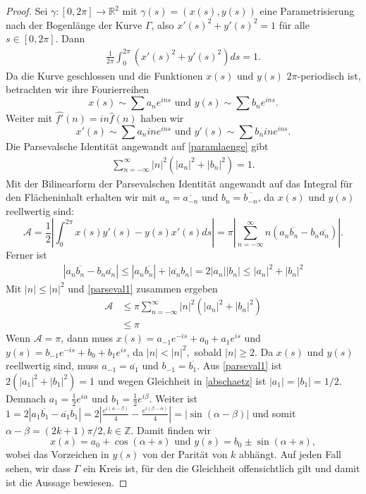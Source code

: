 \documentclass[12pt,a4paper]{article}
\theoremstyle{plain}
\newcommand{\R}{\mathbb{R}}
\newcommand{\Z}{\mathbb{Z}}
\numberwithin{equation}{section}
\begin{document}
\begin{proof}
Sei $\gamma:[0,2\pi]\rightarrow \R^2$ mit $\gamma(s)=(x(s),y(s))$ eine Parametrisierung nach der Bogenlänge der Kurve $\Gamma$, also $x'(s)^2+y'(s)^2=1$ für alle $s\in [0,2\pi]$. Dann \begin{align}\label{paramlaenge}
\frac{1}{2\pi} \int_0^{2\pi} {\left(x'(s)^2+y'(s)^2\right) ds} = 1.
\end{align} 
Da die Kurve geschlossen und die Funktionen $x(s)$ und $y(s)$ $2\pi$-periodisch ist, betrachten wir ihre Fourierreihen \[x(s)\sim \sum a_ne^{ins} \text{ und } y(s)\sim \sum b_ne^{ins}. \]  Weiter mit $\hat{f'}(n)=i n\hat{f}(n)$ haben wir \[x'(s)\sim \sum  a_n i n e^{ins} \text{ und } y'(s)\sim \sum b_n i n e^{ins}. \] Die Parsevalsche Identität angewandt auf \eqref{paramlaenge} gibt \begin{align} \label{parseval1}
\sum_{n=-\infty}^\infty |n|^2(|a_n|^2+|b_n|^2)=1.
\end{align}
Mit der Bilinearform der Parsevalschen Identität angewandt auf das Integral für den Flächen\-in\-halt erhalten wir mit $a_n=\overline{a_{-n}}$ und $b_n=\overline{b_{-n}}$, da $x(s)$ und $y(s)$ reellwertig sind:
\[\mathcal{A}=\frac{1}{2} \left|\int_0^{2\pi} {x(s)y'(s)-y(s)x'(s)ds}\right|=\pi\left|\sum_{n=-\infty}^\infty {n\left(a_n\overline{b_n}-b_n\overline{a_n}\right) } \right|. \] 
Ferner ist \begin{align} \label{abschaetz}
|a_n\overline{b_n} -b_n\overline{a_n}|\leq |a_n\overline{b_n}|+|\overline{a_n}b_n|=2|a_n||b_n|\leq |a_n|^2+|b_n|^2
\end{align}
Mit $|n|\leq |n|^2$ und \eqref{parseval1} zusammen ergeben \begin{align*}
\mathcal{A}&\leq \pi \sum_{n=-\infty}^{\infty}{|n|^2(|a_n|^2+|b_n|^2)} \\
&\leq \pi
\end{align*}
Wenn $\mathcal{A}=\pi$, dann muss $x(s)=a_{-1}e^{-is}+a_0+a_1e^{is}$ und $y(s)=b_{-1}e^{-is}+b_0+b_1e^{is}$, da $|n|<|n|^2,$ sobald $|n|\geq 2$. Da $x(s)$ und $y(s)$ reellwertig sind, muss $a_{-1}=\overline{a_1}$ und $b_{-1}=\overline{b_1}$. Aus \eqref{parseval1} ist $2(|a_1|^2+|b_1|^2)=1$ und wegen Gleichheit in \eqref{abschaetz} ist $|a_1|=|b_1|=1/2.$ Demnach $a_1=\frac{1}{2}e^{i\alpha}$ und $b_1=\frac{1}{2}e^{i\beta}$. Weiter ist $1=2|a_1\overline{b_1}-\overline{a_1}b_1|=2\left|\frac{e^{i(\alpha-\beta)}}{4}-\frac{e^{i(\beta-\alpha)}}{4}\right|=|\sin(\alpha - \beta)|$ und somit $\alpha-\beta=(2k+1)\pi/2, k\in \Z$. Damit finden wir
\[ x(s)=a_0+\cos(\alpha+s) \text{ und } y(s)=b_0 \pm\sin(\alpha +s),\] wobei das Vorzeichen in $y(s)$ von der Parität von $k$ abhängt. Auf jeden Fall sehen, wir dass $\Gamma$ ein Kreis ist, für den die Gleichheit offensichtlich gilt und damit ist die Aussage bewiesen.
\end{proof}
\end{document}
